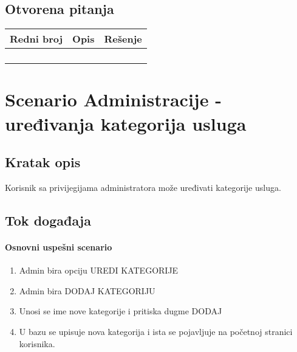 \documentclass[a4paper,12pt]{report}
\newcommand{\genitivfunkcionalnosti}{Administracije - uređivanja kategorija usluga}
\begin{document}
		\subsection{Otvorena pitanja}
			\begin{tabular}{ |c|p{10cm}|l| }
				\hline
				\textbf{Redni broj} & \textbf{Opis} & \textbf{Rešenje} \\ 
				\hline
			    & &  \\
				\hline
			    &  & \\
				\hline
				&  & \\
				\hline
				&  & \\
				\hline
			\end{tabular}
	\section{Scenario \genitivfunkcionalnosti}
		\subsection{Kratak opis}
			Korisnik sa privijegijama administratora može uređivati kategorije usluga.
		\newpage
		\subsection{Tok događaja}
			\paragraph*{Osnovni uspešni scenario}
				\begin{enumerate}
					\item Admin bira opciju UREDI KATEGORIJE
					\item Admin bira DODAJ KATEGORIJU
					\item Unosi se ime nove kategorije i pritiska dugme DODAJ
					\item U bazu se upisuje nova kategorija i ista se pojavljuje na početnoj stranici korisnika.
				\end{enumerate}
\end{document}

